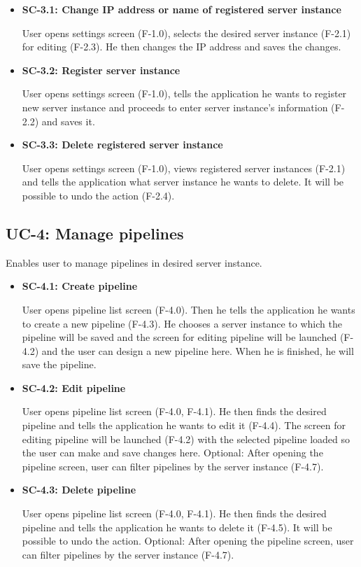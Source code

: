 \begin{itemize}
\item \textbf{SC-3.1: Change IP address or name of registered server instance}

User opens settings screen (F-1.0), selects the desired server instance (F-2.1) for editing (F-2.3). He then changes the IP address and saves the changes.

\item \textbf{SC-3.2: Register server instance}

User opens settings screen (F-1.0), tells the application he wants to register new server instance and proceeds to enter server instance's information (F-2.2) and saves it.

\item \textbf{SC-3.3: Delete registered server instance}

User opens settings screen (F-1.0), views registered server instances (F-2.1) and tells the application what server instance he wants to delete. It will be possible to undo the action (F-2.4).
\end{itemize}


\subsection*{UC-4: Manage pipelines}
Enables user to manage pipelines in desired server instance.

\begin{itemize}
\item \textbf{SC-4.1: Create pipeline}

User opens pipeline list screen (F-4.0). Then he tells the application he wants to create a new pipeline (F-4.3). He chooses a server instance to which the pipeline will be saved and the screen for editing pipeline will be launched (F-4.2) and the user can design a new pipeline here. When he is finished, he will save the pipeline.

\item \textbf{SC-4.2: Edit pipeline}

User opens pipeline list screen (F-4.0, F-4.1). He then finds the desired pipeline and tells the application he wants to edit it (F-4.4). The screen for editing pipeline will be launched (F-4.2) with the selected pipeline loaded so the user can make and save changes here. Optional: After opening the pipeline screen, user can filter pipelines by the server instance (F-4.7).

\item \textbf{SC-4.3: Delete pipeline}

User opens pipeline list screen (F-4.0, F-4.1). He then finds the desired pipeline and tells the application he wants to delete it (F-4.5). It will be possible to undo the action. Optional: After opening the pipeline screen, user can filter pipelines by the server instance (F-4.7).
\end{itemize}


